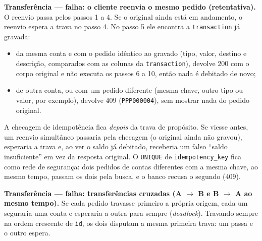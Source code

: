 \documentclass[11pt,a4paper]{article}
\newcommand{\tb}[1]{\texttt{#1}}
\begin{document}
\textbf{Transferência --- falha: o cliente reenvia o mesmo pedido (retentativa).} O reenvio passa
pelos passos 1 a 4. Se o original ainda está em andamento, o reenvio espera a trava no passo 4. No
passo 5 ele encontra a \tb{transaction} já gravada:
\begin{itemize}
  \item da mesma conta e com o pedido idêntico ao gravado (tipo, valor, destino e descrição,
        comparados com as colunas da \tb{transaction}), devolve 200 com o corpo original e não
        executa os passos 6 a 10, então nada é debitado de novo;
  \item de outra conta, ou com um pedido diferente (mesma chave, outro tipo ou valor, por
        exemplo), devolve 409 (\tb{PPP000004}), sem mostrar nada do pedido original.
\end{itemize}
A checagem de idempotência fica \emph{depois} da trava de propósito. Se viesse antes, um reenvio
simultâneo passaria pela checagem (o original ainda não gravou), esperaria a trava e, ao ver o saldo
já debitado, receberia um falso ``saldo insuficiente'' em vez da resposta original. O \tb{UNIQUE}
de \tb{idempotency_key} fica como rede de segurança: dois pedidos de contas diferentes com a mesma
chave, ao mesmo tempo, passam os dois pela busca, e o banco recusa o segundo (409).

\textbf{Transferência --- falha: transferências cruzadas (A $\to$ B e B $\to$ A ao mesmo
tempo).} Se cada pedido travasse primeiro a própria origem, cada um seguraria uma conta e esperaria
a outra para sempre (\emph{deadlock}). Travando sempre na ordem crescente de \tb{id}, os dois
disputam a mesma primeira trava: um passa e o outro espera.

\end{document}
